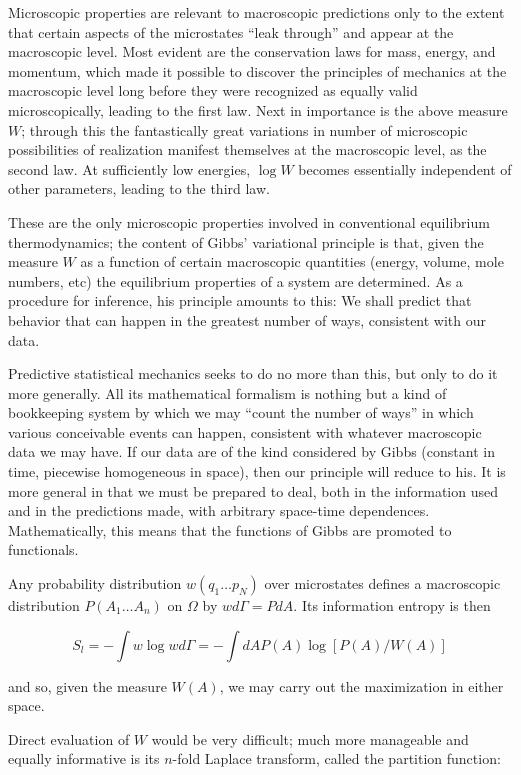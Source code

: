 \documentclass{article}
\begin{document}
Microscopic properties are relevant to macroscopic predictions only to the extent that certain aspects of the microstates ``leak through'' and appear at the macroscopic level. Most evident are the conservation laws for mass, energy, and momentum, which made it possible to discover the principles of mechanics at the macroscopic level long before they were recognized as equally valid microscopically, leading to the first law. Next in importance is the above measure $W$; through this the fantastically great variations in number of microscopic possibilities of realization manifest themselves at the macroscopic level, as the second law. At sufficiently low energies, $\log W$ becomes essentially independent of other parameters, leading to the third law.

These are the only microscopic properties involved in conventional equilibrium thermodynamics; the content of Gibbs' variational principle is that, given the measure $W$ as a function of certain macroscopic quantities (energy, volume, mole numbers, etc) the equilibrium properties of a system are determined. As a procedure for inference, his principle amounts to this: We shall predict that behavior that can happen in the greatest number of ways, consistent with our data.

Predictive statistical mechanics seeks to do no more than this, but only to do it more generally. All its mathematical formalism is nothing but a kind of bookkeeping system by which we may ``count the number of ways'' in which various conceivable events can happen, consistent with whatever macroscopic data we may have. If our data are of the kind considered by Gibbs (constant in time, piecewise homogeneous in space), then our principle will reduce to his. It is more general in that we must be prepared to deal, both in the information used and in the predictions made, with arbitrary space-time dependences. Mathematically, this means that the functions of Gibbs are promoted to functionals.

Any probability distribution $w\left(q_1 \ldots p_N\right)$ over microstates defines a macroscopic distribution $P\left(A_1 \ldots A_n\right)$ on $\Omega$ by $w d \Gamma=P d A$. Its information entropy is then

$$
S_l=-\int w \log w d \Gamma=-\int d A P(A) \log [P(A) / W(A)]
$$

and so, given the measure $W(A)$, we may carry out the maximization in either space.

Direct evaluation of $W$ would be very difficult; much more manageable and equally informative is its $n$-fold Laplace transform, called the partition function:
\end{document}
